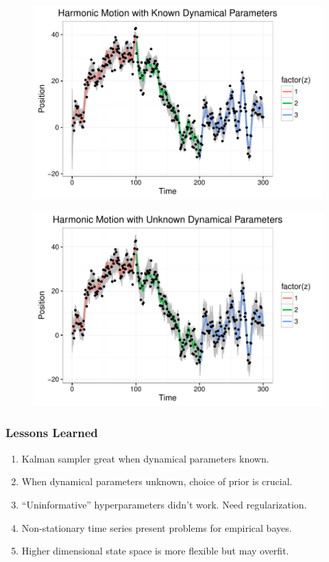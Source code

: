 \documentclass{beamer}
\begin{document}
\begin{frame}
\begin{figure}
  \centering
  \includegraphics[width = 1\linewidth]{"./plot/lds/03_harmonic_known"}
\end{figure}
\end{frame}

\begin{frame}
\begin{figure}
  \centering
  \includegraphics[width = 1\linewidth]{"./plot/lds/04_harmonic_unknown"}
\end{figure}
\end{frame}

\begin{frame}
\frametitle{Lessons Learned}
\begin{enumerate}
\item Kalman sampler great when dynamical parameters known.
\item When dynamical parameters unknown, choice of prior is crucial.
\item ``Uninformative'' hyperparameters didn't work. Need regularization.
\item Non-stationary time series present problems for empirical bayes.
\item Higher dimensional state space is more flexible but may overfit.
\end{enumerate}
\end{frame}
\end{document}
